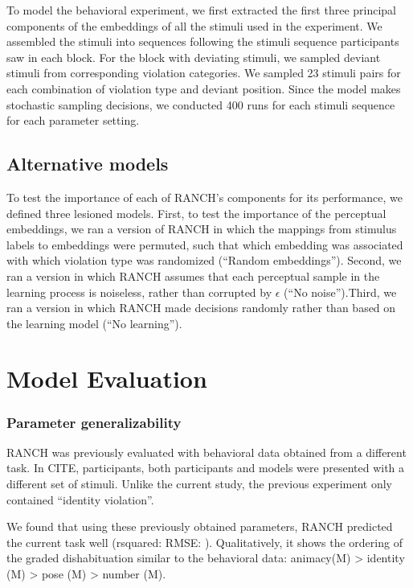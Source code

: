 \documentclass[10pt, letterpaper]{article}
\begin{document}
To model the behavioral experiment, we first extracted the first three
principal components of the embeddings of all the stimuli used in the
experiment. We assembled the stimuli into sequences following the
stimuli sequence participants saw in each block. For the block with
deviating stimuli, we sampled deviant stimuli from corresponding
violation categories. We sampled 23 stimuli pairs for each combination
of violation type and deviant position. Since the model makes stochastic
sampling decisions, we conducted 400 runs for each stimuli sequence for
each parameter setting.

\hypertarget{alternative-models}{%
\subsection{Alternative models}\label{alternative-models}}

To test the importance of each of RANCH's components for its
performance, we defined three lesioned models. First, to test the
importance of the perceptual embeddings, we ran a version of RANCH in
which the mappings from stimulus labels to embeddings were permuted,
such that which embedding was associated with which violation type was
randomized (``Random embeddings''). Second, we ran a version in which
RANCH assumes that each perceptual sample in the learning process is
noiseless, rather than corrupted by \(\epsilon\) (``No noise'').Third,
we ran a version in which RANCH made decisions randomly rather than
based on the learning model (``No learning'').

\hypertarget{model-evaluation}{%
\section{Model Evaluation}\label{model-evaluation}}

\hypertarget{parameter-generalizability}{%
\subsubsection{Parameter
generalizability}\label{parameter-generalizability}}

RANCH was previously evaluated with behavioral data obtained from a
different task. In CITE, participants, both participants and models were
presented with a different set of stimuli. Unlike the current study, the
previous experiment only contained ``identity violation''.

We found that using these previously obtained parameters, RANCH
predicted the current task well (rsquared: RMSE: ). Qualitatively, it
shows the ordering of the graded dishabituation similar to the
behavioral data: animacy(M) \textgreater{} identity (M) \textgreater{}
pose (M) \textgreater{} number (M).
\end{document}
